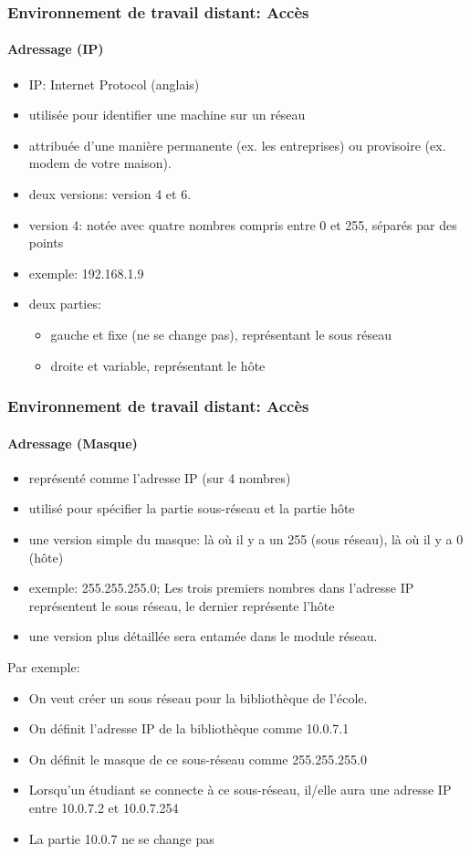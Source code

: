 \documentclass{beamer}
\begin{document}
\begin{frame}
\frametitle{Environnement de travail distant: Accès}
\framesubtitle{Adressage (IP)}

\begin{itemize}
	\item IP: Internet Protocol (anglais)
	\item utilisée pour identifier une machine sur un réseau
	\item attribuée d'une manière permanente (ex. les entreprises) ou provisoire (ex. modem de votre maison). 
	\item deux versions:  version 4 et 6. 
	\item version 4: notée avec quatre nombres compris entre 0 et 255, séparés par des points
	\item exemple: 192.168.1.9
	\item deux parties: 
	\begin{itemize}
		\item gauche et fixe (ne se change pas), représentant le sous réseau 
		\item droite et variable, représentant le hôte
	\end{itemize}
\end{itemize}


\end{frame}

\begin{frame}
\frametitle{Environnement de travail distant: Accès}
\framesubtitle{Adressage (Masque)}

\begin{itemize}
	\item représenté comme l'adresse IP (sur 4 nombres)
	\item utilisé pour spécifier la partie sous-réseau et la partie hôte
	\item une version simple du masque: là où il y a un 255 (sous réseau), là où il y a 0 (hôte)
	\item exemple: 255.255.255.0; Les trois premiers nombres dans l'adresse IP représentent le sous réseau, le dernier représente l'hôte 
	\item une version plus détaillée sera entamée dans le module réseau.
\end{itemize}

Par exemple: 
\begin{itemize}
	\item On veut créer un sous réseau pour la bibliothèque de l'école. 
	\item On définit l'adresse IP de la bibliothèque comme 10.0.7.1 
	\item On définit le masque de ce sous-réseau comme 255.255.255.0 
	\item Lorsqu'un étudiant se connecte à ce sous-réseau, il/elle aura une adresse IP entre 10.0.7.2 et 10.0.7.254 
	\item La partie 10.0.7 ne se change pas 
\end{itemize}




\end{frame}
\end{document}
